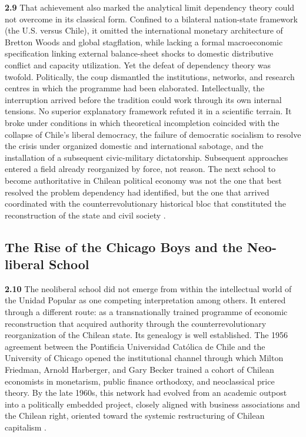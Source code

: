 \textbf{2.9} That achievement also marked the analytical limit dependency theory could not overcome 
in its classical form. Confined to a bilateral nation-state framework (the U.S. versus Chile), it omitted 
the international monetary architecture of Bretton Woods and global stagflation, while lacking a formal 
macroeconomic specification linking external balance-sheet shocks to domestic distributive conflict and 
capacity utilization.  Yet the defeat of dependency theory was twofold. Politically, the coup dismantled the institutions, networks, and research centres in which the programme had been elaborated. Intellectually, the 
interruption arrived before the tradition could work through its own internal tensions. No superior 
explanatory framework refuted it in a scientific terrain. It broke under conditions in which theoretical incompletion coincided with the collapse of Chile's liberal democracy, the failure of democratic socialism to 
resolve the crisis under organized domestic and international sabotage, and the installation of a 
subsequent civic-military dictatorship. Subsequent approaches entered a field already reorganized 
by force, not reason. The next school to become authoritative in Chilean political economy was not 
the one that best resolved the problem dependency had identified, but the one that arrived coordinated 
with the counterrevolutionary historical bloc that constituted the reconstruction of the state and civil society \citep{Casals2021}.

\subsection{The Rise of the Chicago Boys and the Neo-liberal School}
\label{sec:A2_neoliberal_chicago}

\textbf{2.10} The neoliberal school did not emerge from within the intellectual world of the Unidad 
Popular as one competing interpretation among others. It entered through a different route: as a 
transnationally trained programme of economic reconstruction that acquired authority through the 
counterrevolutionary reorganization of the Chilean state. Its genealogy is well established. The 1956 
agreement between the Pontificia Universidad Católica de Chile and the University of Chicago opened 
the institutional channel through which Milton Friedman, Arnold Harberger, and Gary Becker trained 
a cohort of Chilean economists in monetarism, public finance orthodoxy, and neoclassical price theory. 
By the late 1960s, this network had evolved from an academic outpost into a politically embedded 
project, closely aligned with business associations and the Chilean right, oriented toward the systemic 
restructuring of Chilean capitalism \citep{Valdes1995,Fischer2009,Clark2017}.

